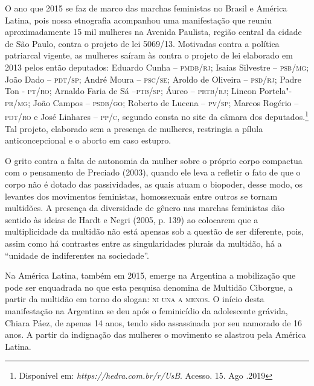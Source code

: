 O ano que 2015 se faz de marco das marchas feministas no Brasil e
América Latina, pois nossa etnografia acompanhou uma manifestação que
reuniu aproximadamente 15 mil mulheres na Avenida Paulista, região
central da cidade de São Paulo, contra o projeto de lei 5069/13.
Motivadas contra a política patriarcal vigente, as mulheres saíram às
contra o projeto de lei elaborado em 2013 pelos então deputados:
Eduardo Cunha --
\textsc{pmdb}/\textsc{rj}; Isaias
Silvestre -- \textsc{psb}/\textsc{mg};
João Dado -- \textsc{pdt}/\textsc{sp};
André Moura -- \textsc{psc}/\textsc{se};
Aroldo de Oliveira -- \textsc{psd}/\textsc{rj};
Padre Ton - \textsc{pt}/\textsc{ro};
Arnaldo Faria de Sá --\textsc{ptb}/\textsc{sp}; Áureo -- \textsc{prtb}/\textsc{rj}; Lincon Portela"-\textsc{pr}/\textsc{mg};
João Campos -- \textsc{psdb}/\textsc{go}; Roberto de Lucena -- \textsc{pv}/\textsc{sp}; Marcos Rogério --
\textsc{pdt}/\textsc{ro} e José Linhares -- \textsc{pp}/\textsc{c}, segundo consta no site da câmara dos
deputados.\footnote{Disponível em:
  \emph{https://hedra.com.br/r/UsB}.
  Acesso. 15. Ago .2019} Tal projeto, elaborado sem a presença de
mulheres, restringia a pílula anticoncepcional e o aborto em caso
estupro.

O grito contra a falta de autonomia da mulher sobre o próprio corpo
compactua com o pensamento de Preciado (2003), quando ele leva a
refletir o fato de que o corpo não é dotado das passividades, as quais
atuam o biopoder, desse modo, os levantes dos movimentos feministas,
homossexuais entre outros se tornam multidões. A presença da diversidade
de gênero nas marchas feministas dão sentido às ideias de Hardt e Negri
(2005, p. 139) ao colocarem que a multiplicidade da multidão não está
apensas sob a questão de ser diferente, pois, assim como há contrastes
entre as singularidades plurais da multidão, há a ``unidade de
indiferentes na sociedade''.

Na América Latina, também em 2015, emerge na Argentina a mobilização que
pode ser enquadrada no que esta pesquisa denomina de Multidão Ciborgue,
a partir da multidão em torno do slogan: \textsc{ni una a menos}. O início desta
manifestação na Argentina se deu após o feminicídio da adolescente
grávida, Chiara Páez, de apenas 14 anos, tendo sido assassinada por seu
namorado de 16 anos. A partir da indignação das mulheres o movimento se
alastrou pela América Latina.

